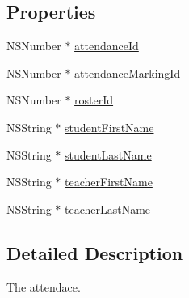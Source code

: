 \subsection*{\-Properties}
\begin{DoxyCompactItemize}
\item 
\-N\-S\-Number $\ast$ \hyperlink{interface_attendance_a47331d4a3bf6a66898af099cf7e8ceb3}{attendance\-Id}
\item 
\-N\-S\-Number $\ast$ \hyperlink{interface_attendance_a2a250e9bc55299c5f2c4936f1346a396}{attendance\-Marking\-Id}
\item 
\-N\-S\-Number $\ast$ \hyperlink{interface_attendance_abd800fad3cefbc7a28865fdbf9841ce5}{roster\-Id}
\item 
\-N\-S\-String $\ast$ \hyperlink{interface_attendance_ac19139347042d483a23013202a923ff8}{student\-First\-Name}
\item 
\-N\-S\-String $\ast$ \hyperlink{interface_attendance_a0750a37e87bdcd6e188846b174faf211}{student\-Last\-Name}
\item 
\-N\-S\-String $\ast$ \hyperlink{interface_attendance_aa8205f78bffac5fd2dd3ce2a44ef1e96}{teacher\-First\-Name}
\item 
\-N\-S\-String $\ast$ \hyperlink{interface_attendance_ad532e084c8758266e0106649e4f5605e}{teacher\-Last\-Name}
\end{DoxyCompactItemize}


\subsection{\-Detailed \-Description}
\-The attendace. 

